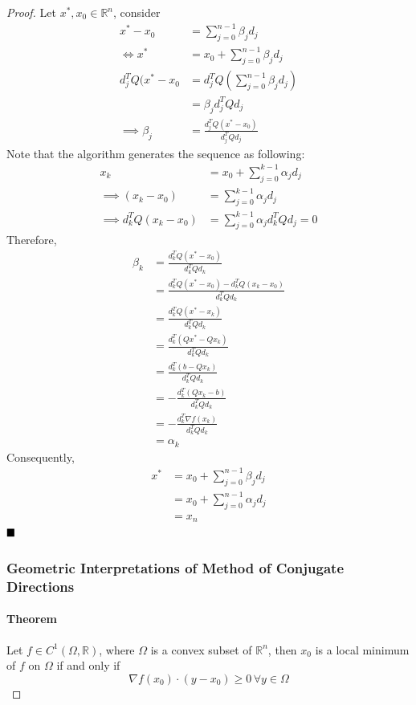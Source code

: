 \documentclass[11pt]{article}
\newcommand{\real}[0]{\mathbb{R}}
\newcommand{\qed}[0]{$\hfill\blacksquare$}
\begin{document}
\begin{proof}
	Let $x^*, x_0 \in \real^n$, consider
	\begin{align}
		x^* - x_0 &= \sum_{j=0}^{n-1}\beta_j d_j \\
		\iff x^* &= x_0 + \sum_{j=0}^{n-1} \beta_j d_j \\
		d_j^TQ(x^* - x_0 &= d_j^TQ(\sum_{j=0}^{n-1} \beta_j d_j) \\
		&= \beta_j d_j^T Q d_j \\
		\implies \beta_j &= \frac{d_j^TQ(x^* - x_0)}{d_j^TQd_j}
	\end{align}
Note that the algorithm generates the sequence as following:
\begin{align}
	x_k &= x_0 + \sum_{j=0}^{k-1} \alpha_j d_j \\
	\implies (x_k - x_0) &= \sum_{j=0}^{k-1} \alpha_j d_j \\
	\implies d_k^TQ(x_k - x_0) &= \sum_{j=0}^{k-1} \alpha_j d_k^T Q d_j = 0
\end{align}
Therefore,
\begin{align}
	\beta_k &= \frac{d_k^TQ(x^* - x_0)}{d_k^TQd_k} \\
	&= \frac{d_k^TQ(x^* - x_0) - d_k^TQ(x_k - x_0)}{d_k^TQd_k} \\
	&= \frac{d_k^TQ(x^* - x_k)}{d_k^TQd_k} \\
	&= \frac{d_k^T(Qx^* - Qx_k)}{d_k^TQd_k} \\
	&= \frac{d_k^T(b - Qx_k)}{d_k^TQd_k} \tag{The first order necessary condition suggests $Qx^* = b$} \\
	&= -\frac{d_k^T(Qx_k - b)}{d_k^TQd_k} \\
	&= -\frac{d_k^T\nabla f(x_k)}{d_k^TQd_k}　\tag{Assuming $f$ is quadratic} \\
	&= \alpha_k
\end{align}
Consequently,
\begin{align}
	x^* &= x_0 + \sum_{j=0}^{n-1}\beta_j d_j \\
	&= x_0 + \sum_{j=0}^{n-1} \alpha_j d_j \\
	&= x_n
\end{align}
\qed

\subsubsection{Geometric Interpretations of Method of Conjugate Directions}
\paragraph{Theorem} Let $f \in C^1 (\Omega, \real)$, where $\Omega$ is a convex subset of $\real^n$, then $x_0$ is a local minimum of $f$ on $\Omega$ if and only if 
$$\nabla f(x_0) \cdot (y - x_0) \geq 0 \, \forall y\in \Omega$$

\end{proof}
\end{document}
